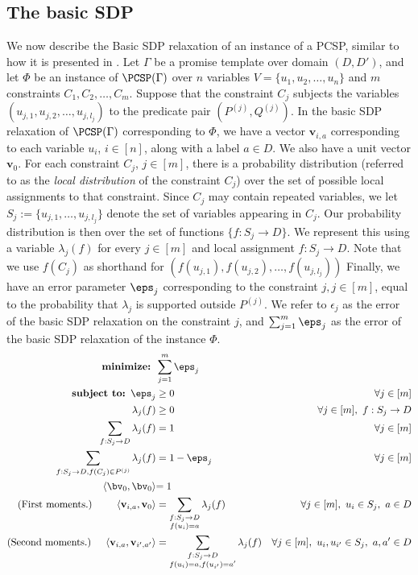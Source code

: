 \subsection{The basic SDP}

We now describe the Basic SDP relaxation of an instance of a PCSP, similar to how it is presented in \cite{Raghavendra08}. Let {$\Gamma$ be a promise template over domain $(D,D')$, and let} $\Phi$ be an instance of {$\PCSP(\Gamma)$} over $n$ variables $V=\{u_1, u_2, \ldots, u_n\}$ and $m$ constraints $C_1, C_2, \ldots, C_m$. Suppose that the constraint $C_j$ {subjects the variables} $( u_{j,1}, u_{j,2}, \ldots, u_{j,l_j})$ {to the predicate pair} $(P^{(j)}, Q^{(j)})$.
In the basic SDP relaxation of ${\PCSP(\Gamma)}$ corresponding to $\Phi$, we have a vector $\textbf{v}_{i,a}$ corresponding to each variable $u_i$, $i \in [n]$, along with a label $a \in D$. We also have a unit vector $\textbf{v}_0$. 
For each constraint $C_j$, $j \in [m]$, there is a probability distribution (referred to as the \emph{local distribution} of the constraint $C_j$) {over the set of possible local assignments to that constraint.} 
{Since $C_j$ may contain repeated variables, we let $S_j := \{u_{j,1}, \hdots, u_{j,l_j}\}$ denote the set of variables appearing in $C_j$. Our probability distribution is then over the set of functions $\{f : S_j \to D\}$.} We represent this using a variable $\lambda_j(f)$ for every $j\in [m]$ and {local} assignment $f: {S_j} \rightarrow D$. {Note that we use $f(C_j)$ as shorthand for $( f(u_{j,1}), f(u_{j,2}), \ldots, f(u_{j,l_j}))$} Finally, we have an error parameter $\eps_j$ corresponding to the constraint $j, j \in [m]$, equal to the probability that $\lambda_j$ is supported outside $P^{(j)}$. We refer to $\epsilon_j$ as the error of the basic SDP relaxation on the constraint $j$, and $\sum_{j=1}^m \eps_j$ as the error of the basic SDP relaxation of the instance $\Phi$.
%
\begin{align*}
    \textbf{minimize: } & \sum_{j=1}^m \eps_j & \\
\textbf{subject to: } \eps_j &\geq 0  & \forall j \in [m]\\
\lambda_j(f) &\geq 0  & \forall j\in [m], ~ f:{S}_j \rightarrow {D} \\ 
\sum_{f:{S}_j \rightarrow D}\lambda_j(f)&=1  & \forall j \in [m] \\ 
 \sum_{f:{S}_j \rightarrow D, f(C_j)\in P^{(j)}} \lambda_j(f) &= 1-\eps_j \quad & \forall j \in [m]\\
{ \langle \bv_0, \bv_0\rangle} &{= 1}\\
\text{ (First moments.)  } \qquad { \langle \textbf{v}_{i,a},   \textbf{v}_0 \rangle } &= \sum_{\substack{f:{S}_j \rightarrow D\\f({u_i}) = a}}\lambda_j(f)&  \forall j\in [m],~{u_i} \in {S}_j,~ a \in D \\ 
\text{(Second moments.)  } \quad { \langle \textbf{v}_{i,a} , \textbf{v}_{i',a'} \rangle } &= \sum_{\substack{f:{S}_j \rightarrow D\\f({u_i}) = a, f({u_{i'}}) = a'}}\lambda_j(f)  & \forall j\in [m],~{u_i,u_{i'}} \in {S}_j,~ a,a' \in D 
\end{align*}
